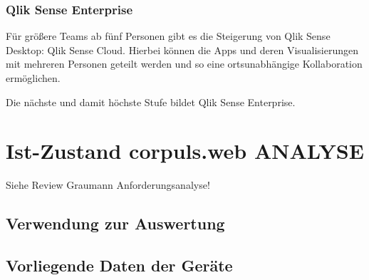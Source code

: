\subsubsection{Qlik Sense Enterprise}
\label{subsub:enterprise}
Für größere Teams ab fünf Personen gibt es die Steigerung von Qlik Sense Desktop: Qlik Sense Cloud. \cite{QlikTech.2019}
Hierbei können die Apps und deren Visualisierungen mit mehreren Personen geteilt werden und so eine ortsunabhängige Kollaboration ermöglichen.

Die nächste und damit höchste Stufe bildet Qlik Sense Enterprise.


\section{Ist-Zustand corpuls.web ANALYSE}
Siehe Review Graumann Anforderungsanalyse!
\subsection{Verwendung zur Auswertung}
\subsection{Vorliegende Daten der Geräte}


